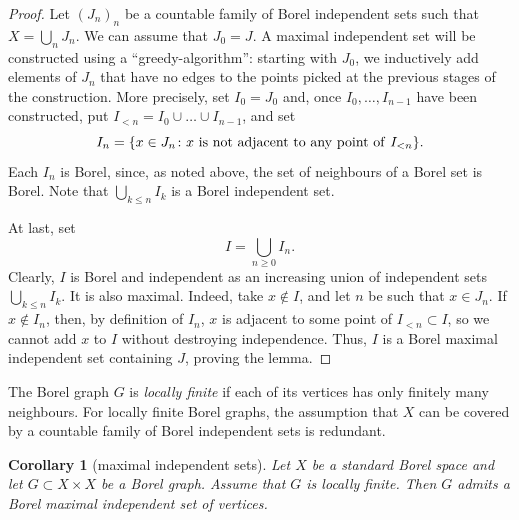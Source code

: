\documentclass[11pt]{paper}
\newtheorem{corollary}{Corollary}
\begin{document}
\begin{proof}
  Let \((J_{n})_{n}\) be a countable family of Borel independent sets such that
  \(X = \bigcup_{n} J_{n}\).  We can assume that $J_0=J$.
A maximal independent set will be constructed using a
  ``greedy-algorithm'': starting with \(J_{0}\), we inductively add elements of \(J_{n}\) that have
  no edges to the points picked at the previous stages of the construction.  More precisely, set
  \(I_{0} = J_{0}\) and, once $I_0, \ldots , I_{n-1}$ have been constructed, put
  $I_{<n}=I_0 \cup \ldots \cup I_{n-1}$, and set
\[
I_n = \{x\in J_n\colon x\ {\rm is\ not\ adjacent\ to\ any\ point\ of\ } I_{<n} \}.
\]
Each $I_n$ is Borel, since, as noted above, the set of neighbours of a Borel set is Borel.  Note
that \(\bigcup_{k \le n} I_{k}\) is a Borel independent set.

At last, set
\[
I = \bigcup_{n\ge 0} I_n.
\]
Clearly, $I$ is Borel and independent as an increasing union of independent sets
\(\bigcup_{k \le n}I_{k}\).  It is also maximal. Indeed, take $x\notin I$, and let \(n\) be such
that \(x \in J_{n}\).  If $x\notin I_n$, then, by definition of $I_n$, $x$ is adjacent to some point
of $I_{<n}\subset I$, so we cannot add $x$ to $I$ without destroying independence. Thus, $I$ is a
Borel maximal independent set containing $J$, proving the lemma.
\end{proof}

The Borel graph $G$ is {\em locally finite} if each of its vertices has only finitely many neighbours.
For locally finite Borel graphs, the assumption that \(X\) can be
covered by a countable family of Borel independent sets is redundant.
\begin{corollary}[maximal independent sets]\label{cor:indep_sets}
Let $X$ be a standard Borel space and let $G\subset X\times X$ be a Borel graph. Assume that
$G$ is locally finite. Then $G$ admits a Borel maximal independent set of vertices.
\end{corollary}
\end{document}
